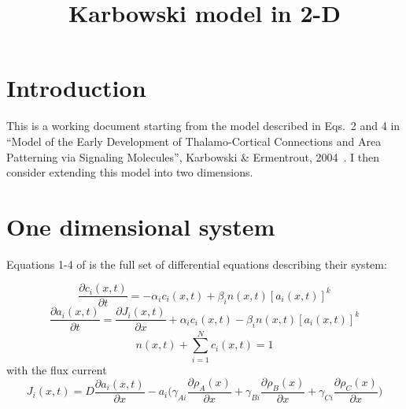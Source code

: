 \documentclass[11pt, a4paper]{article}
\title {
  Karbowski model in 2-D
}
\date{} %
\author{\Authors}
\begin{document}
\setlength{\droptitle}{-1.8cm} %
\maketitle

\vspace{-1.8cm} %

\section{Introduction}

This is a working document starting from the model described in Eqs.~2
and 4 in ``Model of the Early Development of Thalamo-Cortical
Connections and Area Patterning via Signaling Molecules'',
Karbowski \& Ermentrout, 2004~\cite{karbowski_model_2004}. I then
consider extending this model into two dimensions.

\section{One dimensional system}

Equations 1-4 of \cite{karbowski_model_2004} is the full set of
differential equations describing their system:

\begin{equation} \label{eq:Karb1D_dc}
\frac{\partial c_i(x, t)}{\partial t} = -\alpha_i c_i(x, t) + \beta_i
n(x, t)[a_i(x, t)]^k
\end{equation}
%
\begin{equation} \label{eq:Karb1D_da}
\frac{\partial a_i(x, t)}{\partial t} = \frac{\partial J_i(x, t)}{\partial
x} + \alpha_i c_i(x, t) - \beta_i
n(x, t)[a_i(x, t)]^k
\end{equation}
%
\begin{equation} \label{eq:Karb1D_conserve}
n(x, t) + \sum_{i=1}^{N} c_i(x, t) = 1
\end{equation}
%
with the flux current
%
\begin{equation} \label{eq:Karb1D_J}
J_i(x, t) = D \frac{\partial a_i(x, t)}{\partial x} - a_i
\bigg(\gamma_{Ai} \frac{\partial \rho_A(x)}{\partial x} +\gamma_{Bi} \frac{\partial \rho_B(x)}{\partial x} + \gamma_{Ci} \frac{\partial \rho_C(x)}{\partial x} \bigg)
\end{equation}
\end{document}

